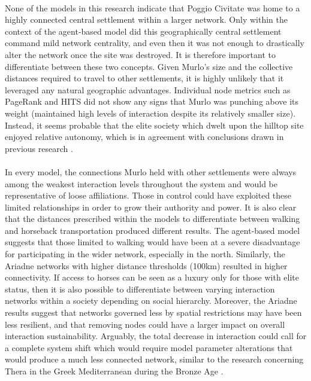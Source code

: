 \documentclass[12pt,a4paper]{thesis}
\begin{document}
\paragraph{}
None of the models in this research indicate that Poggio Civitate was home to a highly connected central settlement within a larger network. Only within the context of the agent-based model did this geographically central settlement command mild network centrality, and even then it was not enough to drastically alter the network once the site was destroyed. It is therefore important to differentiate between these two concepts. Given Murlo's size and the collective distances required to travel to other settlements, it is highly unlikely that it leveraged any natural geographic advantages. Individual node metrics such as PageRank and HITS did not show any signs that Murlo was punching above its weight (maintained high levels of interaction despite its relatively smaller size). Instead, it seems probable that the elite society which dwelt upon the hilltop site enjoyed relative autonomy, which is in agreement with conclusions drawn in previous research \citep{StoRed11}.
 
\paragraph{}
In every model, the connections Murlo held with other settlements were always among the weakest interaction levels throughout the system and would be representative of loose affiliations. Those in control could have exploited these limited relationships in order to grow their authority and power. It is also clear that the distances prescribed within the models to differentiate between walking and horseback transportation produced different results. The agent-based model suggests that those limited to walking would have been at a severe disadvantage for participating in the wider network, especially in the north. Similarly, the Ariadne networks with higher distance thresholds (100km) resulted in higher connectivity. If access to horses can be seen as a luxury only for those with elite status, then it is also possible to differentiate between varying interaction networks within a society depending on social hierarchy. Moreover, the Ariadne results suggest that networks governed less by spatial restrictions may have been less resilient, and that removing nodes could have a larger impact on overall interaction sustainability. Arguably, the total decrease in interaction could call for a complete system shift which would require model parameter alterations that would produce a much less connected network, similar to the research concerning Thera in the Greek Mediterranean during the Bronze Age \citep{KnaRivEva11}.      
\end{document}
